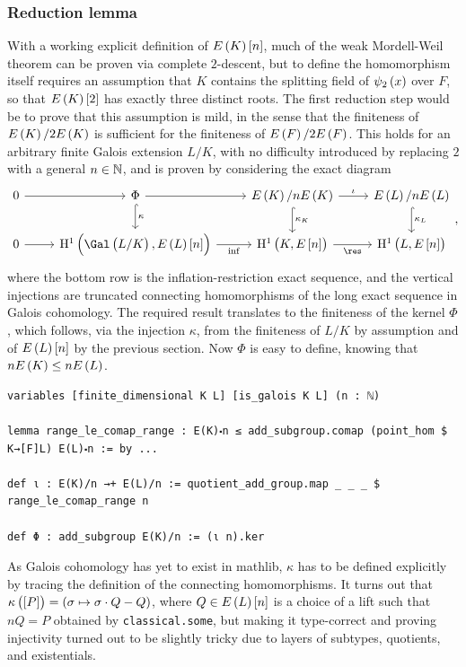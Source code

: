 \subsubsection{Reduction lemma}

With a working explicit definition of $ E\br{K}\sbr{n} $, much of the weak Mordell-Weil theorem can be proven via complete $ 2 $-descent, but to define the homomorphism itself requires an assumption that $ K $ contains the splitting field of $ \psi_2\br{x} $ over $ F $, so that $ E\br{K}\sbr{2} $ has exactly three distinct roots. The first reduction step would be to prove that this assumption is mild, in the sense that the finiteness of $ E\br{K} / 2E\br{K} $ is sufficient for the finiteness of $ E\br{F} / 2E\br{F} $. This holds for an arbitrary finite Galois extension $ L / K $, with no difficulty introduced by replacing $ 2 $ with a general $ n \in \mathbb{N} $, and is proven by considering the exact diagram
$$
\begin{tikzcd}
0 \arrow{r} & \Phi \arrow{r} \arrow[hookrightarrow]{d}{\kappa} & E\br{K} / nE\br{K} \arrow{r}{\iota} \arrow[hookrightarrow]{d}{\kappa_K} & E\br{L} / nE\br{L} \arrow[hookrightarrow]{d}{\kappa_L} \\
0 \arrow{r} & \H^1\br{\Gal\br{L / K}, E\br{L}\sbr{n}} \arrow{r}[swap]{\inf} & \H^1\br{K, E\sbr{n}} \arrow{r}[swap]{\res} & \H^1\br{L, E\sbr{n}}
\end{tikzcd},
$$
where the bottom row is the inflation-restriction exact sequence, and the vertical injections are truncated connecting homomorphisms of the long exact sequence in Galois cohomology. The required result translates to the finiteness of the kernel $ \Phi $, which follows, via the injection $ \kappa $, from the finiteness of $ L / K $ by assumption and of $ E\br{L}\sbr{n} $ by the previous section. Now $ \Phi $ is easy to define, knowing that $ nE\br{K} \le nE\br{L} $.

\begin{lstlisting}[frame=single]
variables [finite_dimensional K L] [is_galois K L] (n : ℕ)

lemma range_le_comap_range : E(K)⬝n ≤ add_subgroup.comap (point_hom $ K→[F]L) E(L)⬝n := by ...

def ι : E(K)/n →+ E(L)/n := quotient_add_group.map _ _ _ $ range_le_comap_range n

def Φ : add_subgroup E(K)/n := (ι n).ker
\end{lstlisting}

As Galois cohomology has yet to exist in mathlib, $ \kappa $ has to be defined explicitly by tracing the definition of the connecting homomorphisms. It turns out that $ \kappa\br{\sbr{P}} = \br{\sigma \mapsto \sigma \cdot Q - Q} $, where $ Q \in E\br{L}\sbr{n} $ is a choice of a lift such that $ nQ = P $ obtained by \texttt{classical.some}, but making it type-correct and proving injectivity turned out to be slightly tricky due to layers of subtypes, quotients, and existentials.

